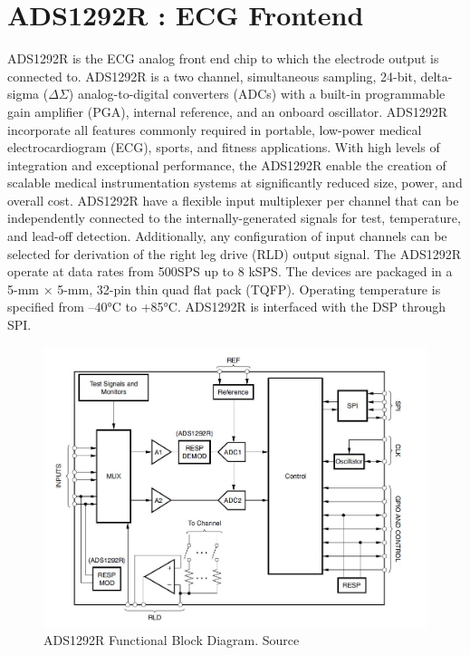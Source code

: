 \section{ADS1292R : ECG Frontend}
ADS1292R is the ECG analog front end chip to which the electrode output is connected to.
ADS1292R is a two channel, simultaneous sampling, 24-bit, delta-sigma ($\Delta$$\Sigma$) analog-to-digital converters (ADCs) with a built-in programmable gain amplifier (PGA), internal reference, and an onboard oscillator.  ADS1292R incorporate all features commonly required in portable, low-power medical electrocardiogram (ECG), sports, and fitness applications. With high levels of integration and exceptional performance, the ADS1292R enable the creation of scalable medical instrumentation systems at significantly reduced size, power, and overall cost. ADS1292R have a flexible input multiplexer per channel that can be independently connected to the internally-generated signals for test, temperature, and lead-off detection. Additionally, any configuration of input channels can be selected for derivation of the right leg drive (RLD) output signal. The ADS1292R operate at data rates from 500SPS up to 8 kSPS. The devices are packaged in a 5-mm × 5-mm, 32-pin thin quad flat pack (TQFP). Operating temperature is specified from –40°C to +85°C. ADS1292R is interfaced with the DSP through SPI.
 \begin{figure}[h]
 	\centering
 	\includegraphics[scale = 0.5 ]{ADS1292R.JPG}
 	\caption{ADS1292R Functional Block Diagram. Source \cite{ads}\label{ADS1292R}}
 \end{figure}
 
